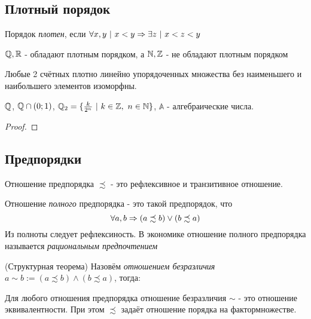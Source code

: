 \subsection{Плотный порядок}

\begin{definition}
	Порядок \textit{плотен}, если $\forall x, y\ |\ x < y \Rightarrow \exists z\ |\ x < z < y$ 
\end{definition}

\begin{example}
	$\mathbb{Q}, \mathbb{R}$ - обладают плотным порядком, а $\mathbb{N}, \mathbb{Z}$ - не обладают плотным порядком
\end{example}

\begin{theorem}
	Любые 2 счётных плотно линейно упорядоченных множества без наименьшего и наибольшего элементов изоморфны.
\end{theorem}

\begin{example}
	$\mathbb{Q}$, $\mathbb{Q} \cap (0;1)$, $\Q_2 = \{\frac{k}{2^n}\ |\ k \in \Z,\ n \in \N\}$, $\mathbb{A}$ - алгебраические числа.
\end{example}

\begin{proof}
\end{proof}

\subsection{Предпорядки}

\begin{definition}
	Отношение предпорядка $\precsim$ - это рефлексивное и транзитивное отношение.
\end{definition}

\begin{definition}
	Отношение \textit{полного} предпорядка - это такой предпорядок, что
	$$
		\forall a, b \Rightarrow (a \precsim b) \vee (b \precsim a)
	$$
	Из полноты следует рефлексиность. В экономике отношение полного предпорядка называется \textit{рациональным предпочтением}
\end{definition}

\begin{theorem} (Структурная теорема)
	Назовём \textit{отношением безразличия} $a \sim b := (a \precsim b) \wedge (b \precsim a)$, тогда:
	
	Для любого отношения предпорядка отношение безразличия $\sim$ - это отношение эквивалентности. При этом $\precsim$ задаёт отношение порядка на фактормножестве.
\end{theorem}

